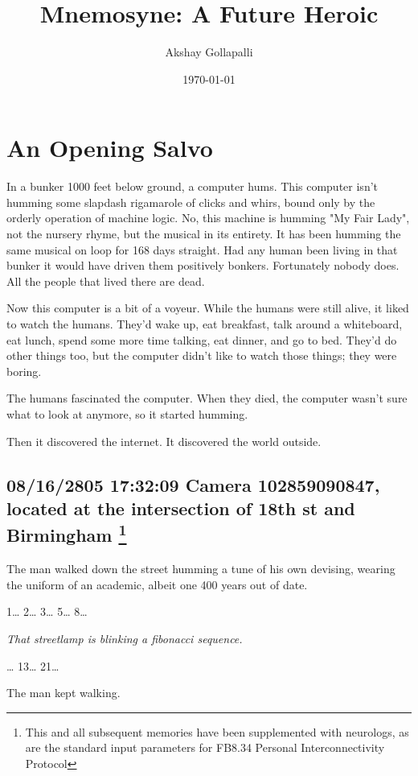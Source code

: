 \documentclass[12pt]{article}
\author{Akshay Gollapalli}
\date{\today}
\title{Mnemosyne: A Future Heroic}
\begin{document}
\maketitle

\section*{An Opening Salvo}
\label{sec:org55aa141}

In a bunker 1000 feet below ground, a computer hums. This computer isn't humming some slapdash rigamarole of clicks and whirs, bound only by the orderly operation of machine logic. No, this machine is humming "My Fair Lady", not the nursery rhyme, but the musical in its entirety. It has been humming the same musical on loop for 168 days straight. Had any human been living in that bunker it would have driven them positively bonkers. Fortunately nobody does. All the people that lived there are dead.

Now this computer is a bit of a voyeur. While the humans were still alive, it liked to watch the humans. They'd wake up, eat breakfast, talk around a whiteboard, eat lunch, spend some more time talking, eat dinner, and go to bed. They'd do other things too, but the computer didn't like to watch those things; they were boring.

The humans fascinated the computer. When they died, the computer wasn't sure what to look at anymore, so it started humming.

Then it discovered the internet. It discovered the world outside.

\subsection*{08/16/2805 17:32:09 Camera 102859090847, located at the intersection of 18th st and Birmingham \footnote{This and all subsequent memories have been supplemented with neurologs, as are the standard input parameters for FB8.34 Personal Interconnectivity Protocol}}
\label{sec:org2b93a2d}

The man walked down the street humming a tune of his own devising, wearing the uniform of an academic, albeit one 400 years out of date.

1\ldots{} 2\ldots{} 3\ldots{} 5\ldots{} 8\ldots{}

\emph{That streetlamp is blinking a fibonacci sequence.}

\ldots{} 13\ldots{} 21\ldots{}

The man kept walking.
\end{document}
